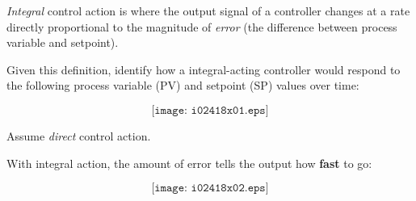 

{\it Integral} control action is where the output signal of a controller changes at a rate directly proportional to the magnitude of {\it error} (the difference between process variable and setpoint).

Given this definition, identify how a integral-acting controller would respond to the following process variable (PV) and setpoint (SP) values over time:

$$\texttt{[image: i02418x01.eps]}$$

Assume {\it direct} control action.







With integral action, the amount of error tells the output how {\bf fast} to go:

$$\texttt{[image: i02418x02.eps]}$$











